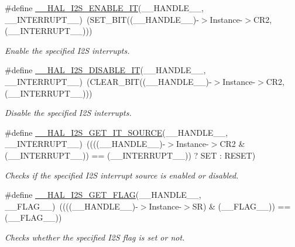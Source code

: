\begin{DoxyCompactItemize}
\#define \hyperlink{group___i2_s___exported__macros_gad6f90125be5ad17065e5378c7580708a}{\+\_\+\+\_\+\+H\+A\+L\+\_\+\+I2\+S\+\_\+\+E\+N\+A\+B\+L\+E\+\_\+\+IT}(\+\_\+\+\_\+\+H\+A\+N\+D\+L\+E\+\_\+\+\_\+,  \+\_\+\+\_\+\+I\+N\+T\+E\+R\+R\+U\+P\+T\+\_\+\+\_\+)~(S\+E\+T\+\_\+\+B\+IT((\+\_\+\+\_\+\+H\+A\+N\+D\+L\+E\+\_\+\+\_\+)-\/$>$Instance-\/$>$C\+R2,(\+\_\+\+\_\+\+I\+N\+T\+E\+R\+R\+U\+P\+T\+\_\+\+\_\+)))
\begin{DoxyCompactList}\small\item\em Enable the specified I2S interrupts. \end{DoxyCompactList}\item 
\#define \hyperlink{group___i2_s___exported__macros_gaa78db4341e43a5fb30c815b22137a9e7}{\+\_\+\+\_\+\+H\+A\+L\+\_\+\+I2\+S\+\_\+\+D\+I\+S\+A\+B\+L\+E\+\_\+\+IT}(\+\_\+\+\_\+\+H\+A\+N\+D\+L\+E\+\_\+\+\_\+,  \+\_\+\+\_\+\+I\+N\+T\+E\+R\+R\+U\+P\+T\+\_\+\+\_\+)~(C\+L\+E\+A\+R\+\_\+\+B\+IT((\+\_\+\+\_\+\+H\+A\+N\+D\+L\+E\+\_\+\+\_\+)-\/$>$Instance-\/$>$C\+R2,(\+\_\+\+\_\+\+I\+N\+T\+E\+R\+R\+U\+P\+T\+\_\+\+\_\+)))
\begin{DoxyCompactList}\small\item\em Disable the specified I2S interrupts. \end{DoxyCompactList}\item 
\#define \hyperlink{group___i2_s___exported__macros_ga722512f6ff5e3bc5c6ef34ae2ab93f4e}{\+\_\+\+\_\+\+H\+A\+L\+\_\+\+I2\+S\+\_\+\+G\+E\+T\+\_\+\+I\+T\+\_\+\+S\+O\+U\+R\+CE}(\+\_\+\+\_\+\+H\+A\+N\+D\+L\+E\+\_\+\+\_\+,  \+\_\+\+\_\+\+I\+N\+T\+E\+R\+R\+U\+P\+T\+\_\+\+\_\+)~((((\+\_\+\+\_\+\+H\+A\+N\+D\+L\+E\+\_\+\+\_\+)-\/$>$Instance-\/$>$C\+R2 \& (\+\_\+\+\_\+\+I\+N\+T\+E\+R\+R\+U\+P\+T\+\_\+\+\_\+)) == (\+\_\+\+\_\+\+I\+N\+T\+E\+R\+R\+U\+P\+T\+\_\+\+\_\+)) ? S\+ET \+: R\+E\+S\+ET)
\begin{DoxyCompactList}\small\item\em Checks if the specified I2S interrupt source is enabled or disabled. \end{DoxyCompactList}\item 
\#define \hyperlink{group___i2_s___exported__macros_gab4dcaccc00ab76a11c23a49e973df009}{\+\_\+\+\_\+\+H\+A\+L\+\_\+\+I2\+S\+\_\+\+G\+E\+T\+\_\+\+F\+L\+AG}(\+\_\+\+\_\+\+H\+A\+N\+D\+L\+E\+\_\+\+\_\+,  \+\_\+\+\_\+\+F\+L\+A\+G\+\_\+\+\_\+)~((((\+\_\+\+\_\+\+H\+A\+N\+D\+L\+E\+\_\+\+\_\+)-\/$>$Instance-\/$>$SR) \& (\+\_\+\+\_\+\+F\+L\+A\+G\+\_\+\+\_\+)) == (\+\_\+\+\_\+\+F\+L\+A\+G\+\_\+\+\_\+))
\begin{DoxyCompactList}\small\item\em Checks whether the specified I2S flag is set or not. \end{DoxyCompactList}\item 

\end{DoxyCompactItemize}
